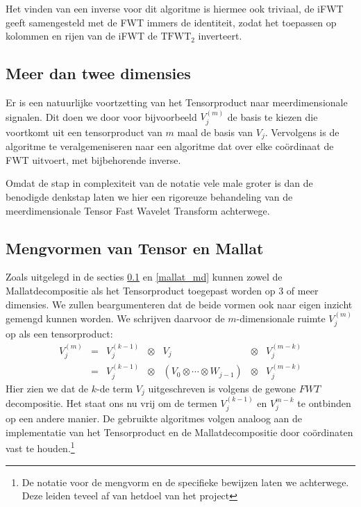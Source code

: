 Het vinden van een inverse voor dit algoritme is hiermee ook triviaal, de iFWT geeft samengesteld met de FWT
immers de identiteit, zodat het toepassen op kolommen en rijen van de iFWT de $\mathrm{TFWT}_2$ inverteert.

\subsection{Meer dan twee dimensies}
\label{tensor_md}
Er is een natuurlijke voortzetting van het Tensorproduct naar meerdimensionale signalen.
Dit doen we door voor bijvoorbeeld  $V^{(m)}_j$ de basis te kiezen die voortkomt uit
een tensorproduct van $m$ maal de basis van $V_j$.
Vervolgens is de algoritme te veralgemeniseren naar een algoritme dat over elke co\"ordinaat de FWT 
uitvoert, met bijbehorende inverse.

Omdat de stap in complexiteit van de notatie vele male groter is dan de benodigde denkstap laten we hier een rigoreuze
behandeling van de meerdimensionale Tensor Fast Wavelet Transform achterwege.

\subsection{Mengvormen van Tensor en Mallat}
Zoals uitgelegd in de secties \ref{tensor_md} en \ref{mallat_md} kunnen zowel de Mallatdecompositie als
het Tensorproduct toegepast worden op $3$ of meer dimensies. We zullen beargumenteren dat de beide
vormen ook naar eigen inzicht gemengd kunnen worden. We schrijven daarvoor de $m$-dimensionale 
ruimte $V_j^{(m)}$ op als een tensorproduct:
\begin{equation*}
\begin{array}{ccccccc}
  V_j^{(m)} &=& V_j^{(k-1)} &\otimes&              V_j                     &\otimes& V_j^{(m-k)} \\
            &=& V_j^{(k-1)} &\otimes& (V_0 \otimes \cdots \otimes W_{j-1}) &\otimes& V_j^{(m-k)}
\end{array}
\end{equation*}
Hier zien we dat de $k$-de term $V_j$ uitgeschreven is volgens de gewone $FWT$
decompositie. Het staat ons nu vrij om de termen $V_j^{(k-1)}$ en $V_j^{m-k}$ te ontbinden
op een andere manier. De gebruikte algoritmes volgen analoog aan de implementatie van het Tensorproduct
en de Mallatdecompositie door co\"ordinaten vast te houden.\footnote{De notatie voor de mengvorm en de specifieke bewijzen laten we achterwege. Deze leiden teveel af van hetdoel van het project }

